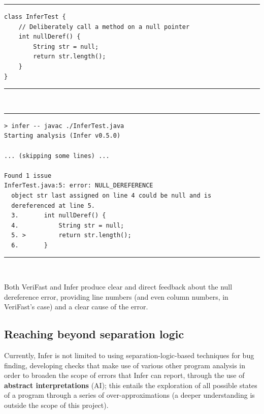\noindent\rule{\textwidth}{0.5pt}
\vspace{-0.6cm}
\begin{verbatim}
class InferTest {
    // Deliberately call a method on a null pointer
    int nullDeref() {
        String str = null;
        return str.length();
    }
}
\end{verbatim}
\vspace{-0.6cm}
\noindent\rule{\textwidth}{0.5pt}
\vspace{-0.6cm}
~
\label{fig:infer-example}
\vspace{0.5cm}

\noindent\rule{\textwidth}{0.5pt}
\vspace{-0.6cm}
\begin{verbatim}
> infer -- javac ./InferTest.java
Starting analysis (Infer v0.5.0)

... (skipping some lines) ...

Found 1 issue
InferTest.java:5: error: NULL_DEREFERENCE
  object str last assigned on line 4 could be null and is
  dereferenced at line 5.
  3.       int nullDeref() {
  4.           String str = null;
  5. >         return str.length();
  6.       }
\end{verbatim}
\vspace{-0.4cm}
\noindent\rule{\textwidth}{0.5pt}
\vspace{-0.6cm}
~
\label{fig:infer-example-output}
\vspace{0.5cm}

Both VeriFast and Infer produce clear and direct feedback about the null
dereference error, providing line numbers (and even column numbers, in
VeriFast's case) and a clear cause of the error.

\subsection{Reaching beyond separation logic}

Currently, Infer is not limited to using separation-logic-based techniques for
bug finding, developing checks that make use of various other program analysis
in order to broaden the scope of errors that Infer can report, through the use
of \textbf{abstract interpretations} (AI); this entails the exploration of all
possible states of a program through a series of over-approximations (a deeper
understanding is outside the scope of this project).

